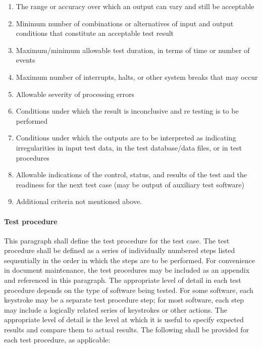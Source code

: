 \documentclass{fidata-report-template}
\begin{document}
\begin{enumerate}
\itemsep1pt\parskip0pt
\item
  The range or accuracy over which an output can vary and still be
  acceptable
\item
  Minimum number of combinations or alternatives of input and output
  conditions that constitute an acceptable test result
\item
  Maximum/minimum allowable test duration, in terms of time or number of
  events
\item
  Maximum number of interrupts, halts, or other system breaks that may
  occur
\item
  Allowable severity of processing errors
\item
  Conditions under which the result is inconclusive and re testing is to
  be performed
\item
  Conditions under which the outputs are to be interpreted as indicating
  irregularities in input test data, in the test database/data files, or
  in test procedures
\item
  Allowable indications of the control, status, and results of the test
  and the readiness for the next test case (may be output of auxiliary
  test software)
\item
  Additional criteria not mentioned above.
\end{enumerate}

\paragraph{Test procedure}

This paragraph shall define the test procedure for the test case. The
test procedure shall be defined as a series of individually numbered
steps listed sequentially in the order in which the steps are to be
performed. For convenience in document maintenance, the test procedures
may be included as an appendix and referenced in this paragraph. The
appropriate level of detail in each test procedure depends on the type
of software being tested. For some software, each keystroke may be a
separate test procedure step; for most software, each step may include a
logically related series of keystrokes or other actions. The appropriate
level of detail is the level at which it is useful to specify expected
results and compare them to actual results. The following shall be
provided for each test procedure, as applicable:
\end{document}
